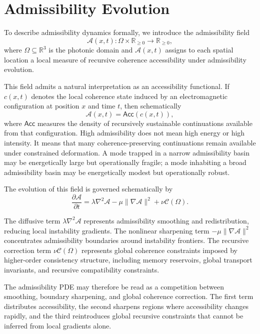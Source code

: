 \documentclass[11pt,openany]{book}
\theoremstyle{definition}
\theoremstyle{plain}
\newcommand{\Afield}{\mathcal{A}}
\newcommand{\Cfield}{\mathcal{C}}
\begin{document}
\section{Admissibility Evolution}

To describe admissibility dynamics formally, we introduce the admissibility field
\[
\Afield(x,t) : \Omega \times \mathbb{R}_{\geq 0} \to \mathbb{R}_{\geq 0},
\]
where $\Omega \subseteq \mathbb{R}^3$ is the photonic domain and $\Afield(x,t)$ assigns to each spatial location a local measure of recursive coherence accessibility under admissibility evolution.

This field admits a natural interpretation as an accessibility functional. If $c(x,t)$ denotes the local coherence state induced by an electromagnetic configuration at position $x$ and time $t$, then schematically
\[
\Afield(x,t) = \mathsf{Acc}(c(x,t)),
\]
where $\mathsf{Acc}$ measures the density of recursively sustainable continuations available from that configuration. High admissibility does not mean high energy or high intensity. It means that many coherence-preserving continuations remain available under constrained deformation. A mode trapped in a narrow admissibility basin may be energetically large but operationally fragile; a mode inhabiting a broad admissibility basin may be energetically modest but operationally robust.

The evolution of this field is governed schematically by
\[
\frac{\partial \Afield}{\partial t}
=
\lambda \nabla^2 \Afield
-
\mu \|\nabla \Afield\|^2
+
\nu \Cfield(\Omega).
\]

The diffusive term $\lambda \nabla^2 \Afield$ represents admissibility smoothing and redistribution, reducing local instability gradients. The nonlinear sharpening term $-\mu \|\nabla \Afield\|^2$ concentrates admissibility boundaries around instability frontiers. The recursive correction term $\nu \Cfield(\Omega)$ represents global coherence constraints imposed by higher-order consistency structure, including memory reservoirs, global transport invariants, and recursive compatibility constraints.

The admissibility PDE may therefore be read as a competition between smoothing, boundary sharpening, and global coherence correction. The first term distributes accessibility, the second sharpens regions where accessibility changes rapidly, and the third reintroduces global recursive constraints that cannot be inferred from local gradients alone.
\end{document}
